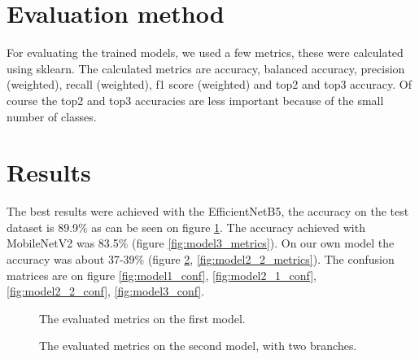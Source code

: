 \documentclass[twocolumn]{article}
\begin{document}
	\section{Evaluation method}
	For evaluating the trained models, we used a few metrics, these were calculated using sklearn. The calculated metrics are accuracy, balanced accuracy, precision (weighted), recall (weighted), f1 score (weighted) and top2 and top3 accuracy. Of course the top2 and top3 accuracies are less important because of the small number of classes.
	
	\section{Results}
	The best results were achieved with the EfficientNetB5, the accuracy on the test dataset is 89.9\% as can be seen on figure \ref{fig:model1_metrics}. The accuracy achieved with MobileNetV2 was 83.5\% (figure \ref{fig:model3_metrics}). On our own model the accuracy was about 37-39\% (figure \ref{fig:model2_1_metrics}, \ref{fig:model2_2_metrics}).
	The confusion matrices are on figure \ref{fig:model1_conf}, \ref{fig:model2_1_conf}, \ref{fig:model2_2_conf}, \ref{fig:model3_conf}.
	
	\begin{figure}[htb]
		\centering
		\caption{The evaluated metrics on the first model.}
		\label{fig:model1_metrics}
	\end{figure}
	\begin{figure}[htb]
		\centering
		\caption{The evaluated metrics on the second model, with two branches.}
		\label{fig:model2_1_metrics}
	\end{figure}
	
\end{document}
